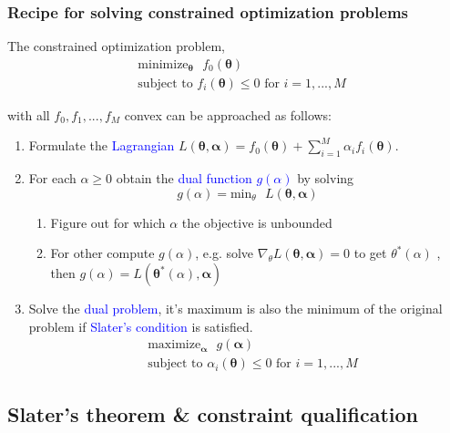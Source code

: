 \documentclass[a4paper,10pt,twoside=true,DIV=10,headsepline,plainheadsepline]{scrartcl}
\begin{document}
			\subsubsection{Recipe for solving constrained optimization problems}

			The constrained optimization problem,
			\begin{align}
				&\textrm{minimize}_{\mathbf{\theta}} \textrm{ } f_0(\mathbf{\theta}) \\
				&\textrm{subject to } f_i(\mathbf{\theta}) \leq 0 \textrm{ for } i = 1, ... , M
			\end{align}

			with all $f_0 , f_1, ... , f_M$ convex can be approached as follows:

			\begin{enumerate}
				\item Formulate the \textcolor{blue}{Lagrangian} $L(\mathbf{\theta}, \mathbf{\alpha}) = f_0(\mathbf{\theta}) + \sum_{i=1}^M \alpha_i f_i(\mathbf{\theta})$.
				\item For each $\alpha \geq 0$ obtain the \textcolor{blue}{dual function $g(\alpha)$} by solving
					\begin{equation} 
						g(\alpha) = \textrm{min}_{\theta} \textrm{ } L(\mathbf{\theta}, \mathbf{\alpha})
					\end{equation}
				\begin{enumerate}
					\item Figure out for which $\alpha$ the objective is unbounded
					\item For other compute $g(\alpha)$, e.g. solve $\nabla_{\theta} L(\mathbf{\theta}, \mathbf{\alpha}) = 0$ to get $\theta^* (\alpha)$			, then 	$g(\alpha) = L(\mathbf{\theta}^* (\alpha), \mathbf{\alpha})$	
				\end{enumerate}
				\item Solve the \textcolor{blue}{dual problem}, it’s maximum is also the minimum of the
original problem if \textcolor{blue}{Slater’s condition} is satisfied.
					\begin{align}
				&\textrm{maximize}_{\mathbf{\alpha}} \textrm{ } g(\mathbf{\alpha}) \\
				&\textrm{subject to } \alpha_i(\mathbf{\theta}) \leq 0 \textrm{ for } i = 1, ... , M
					\end{align}
			\end{enumerate}

		\subsection{Slater’s theorem \& constraint qualification}
\end{document}
